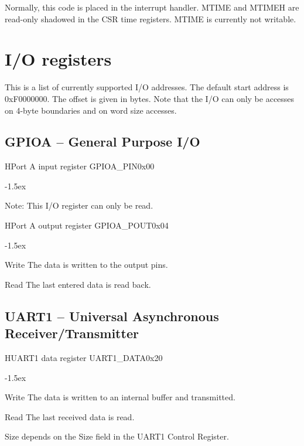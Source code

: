 \documentclass[12pt]{article}
\begin{document}
Normally, this code is placed in the interrupt handler. MTIME and MTIMEH are read-only shadowed in the CSR time registers. MTIME is currently not writable.

\section{I/O registers}
\label{sec:ioregisters}
This is a list of currently supported I/O addresses. 
The default start address is 0xF0000000. The offset is given in bytes. Note that the I/O can only be accesses on 4-byte boundaries and on word size accesses.

\subsection{GPIOA -- General Purpose I/O}

\begin{register}{H}{Port A input register GPIOA\_PIN}{0x00}%
\label{pinx}%
\regnewline%
\end{register}
\begin{regdesc}[0.6\textwidth]\begin{reglist}[000000000]
\itemsep-1.5ex
\item[Note:] This I/O register can only be read.
\end{reglist}\end{regdesc}

\begin{register}{H}{Port A output register GPIOA\_POUT}{0x04}%
\label{poutx}%
\regnewline%
\end{register}
\begin{regdesc}[0.6\textwidth]\begin{reglist}[000000000]
\itemsep-1.5ex
\item[Write] The data is written to the output pins.
\item[Read] The last entered data is read back.
\end{reglist}\end{regdesc}

\subsection{UART1 -- Universal Asynchronous Receiver/Transmitter}

\begin{register}{H}{UART1 data register UART1\_DATA}{0x20}
\label{uart1data}
%
%
\regnewline%
\end{register}
\begin{regdesc}[0.6\textwidth]\begin{reglist}[000000000]
\itemsep-1.5ex
\item[Write] The data is written to an internal buffer and transmitted.
\item[Read] The last received data is read.
\end{reglist}\end{regdesc}
\hspace*{2cm}Size depends on the Size field in the UART1 Control Register.
\end{document}
